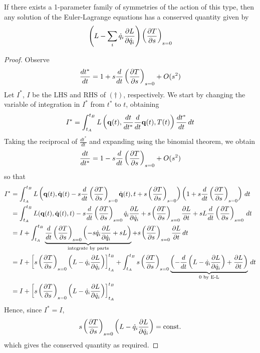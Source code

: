 \documentclass{../template/note}
\begin{document}
    \begin{theorem}
        If there exists a 1-parameter family of symmetries of the action of this type, then any solution of the Euler-Lagrange equations has a conserved quantity given by
        \begin{align*}
            \left(L - \sum_i \dot q_i \pd{L}{\dot q_i}\right) \left(\pd{T}{s}\right)_{s=0}
        \end{align*}    
    \end{theorem}
    
    \begin{proof}
        Observe
        \begin{align*}
            \frac{dt^*}{dt} = 1 + s \frac{d}{dt} \left(\pd{T}{s}\right)_{s=0} + O(s^2)
        \end{align*}
        Let $I^*$, $I$ be the LHS and RHS of $(\dagger)$, respectively. We start by changing the variable of integration in $I^*$ from $t^*$ to $t$, obtaining
        \begin{align*}
            I^* = \int_{t_A}^{t_B} L\left(\V q(t), \frac{dt}{dt^*}\frac{d}{dt} \V q(t), T(t)\right) \frac{dt^*}{dt} \D t 
        \end{align*}
        Taking the reciprocal of $\frac{dt^*}{dt}$ and expanding using the binomial theorem, we obtain
        \begin{align*}
            \frac{dt}{dt^*} = 1 - s \frac{d}{dt} \left(\pd{T}{s}\right)_{s=0} + O(s^2)
        \end{align*}
        so that
        \begin{align*}
            I^* &= \int_{t_A}^{t_B} L\left(\V q(t), \dot{\V q}(t) - s \frac{d}{dt} \left(\pd{T}{s}\right)_{s=0} \dot{\V q}(t), t + s\left(\pd{T}{s}\right)_{s=0}\right) \left(1 + s \frac{d}{dt} \left(\pd{T}{s}\right)_{s=0}\right) \D t \\
            &= \int_{t_A}^{t_B} L(\V q(t), \dot{\V q}(t), t) - s \frac{d}{dt} \left(\pd{T}{s}\right)_{s=0} \dot q_i \pd{L}{\dot q_i} + s \left(\pd{T}{s}\right)_{s=0} \pd{L}{t} + sL \frac{d}{dt} \left(\pd{T}{s}\right)_{s=0} \D t \\
            &= I + \int_{t_A}^{t_B} \underbrace{\frac{d}{dt} \left(\pd{T}{s}\right)_{s=0} \left(-s \dot q_i \pd{L}{\dot q_i} + sL\right)}_{\text{integrate by parts}} + s\left(\pd{T}{s}\right)_{s=0} \pd{L}{t} \D t \\
            &= I + \left[s\left(\pd{T}{s}\right)_{s=0}\left(L - \dot q_i \pd{L}{\dot q_i}\right)\right]_{t_A}^{t_B} + \int_{t_A}^{t_B} s \left(\pd{T}{s}\right)_{s=0} \underbrace{\left(-\frac{d}{dt} \left(L - \dot q_i \pd{L}{\dot q_i}\right) + \pd{L}{t}\right)}_{0 \text{ by E-L}} \D t \\
            &= I + \left[s\left(\pd{T}{s}\right)_{s=0}\left(L - \dot q_i \pd{L}{\dot q_i}\right)\right]_{t_A}^{t_B}
        \end{align*}
        Hence, since $I^* = I$,
        \begin{align*}
            s\left(\pd{T}{s}\right)_{s=0}\left(L - \dot q_i \pd{L}{\dot q_i}\right) = \text{const.}
        \end{align*}
        which gives the conserved quantity as required.
    \end{proof}
    
\end{document}
